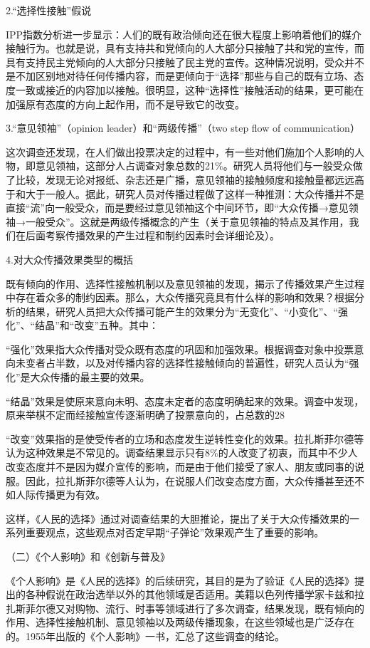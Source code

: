 \documentclass[UTF8,12pt]{ctexart}
\numberwithin{equation}{section} %
\numberwithin{figure}{section}
\numberwithin{table}{section}
\begin{document}
	2.“选择性接触”假说
	
	IPP指数分析进一步显示：人们的既有政治倾向还在很大程度上影响着他们的媒介接触行为。也就是说，具有支持共和党倾向的人大部分只接触了共和党的宣传，而具有支持民主党倾向的人大部分只接触了民主党的宣传。这种情况说明，受众并不是不加区别地对待任何传播内容，而是更倾向于“选择”那些与自己的既有立场、态度一致或接近的内容加以接触。很明显，这种“选择性”接触活动的结果，更可能在加强原有态度的方向上起作用，而不是导致它的改变。
	
	3.“意见领袖”（opinion leader）和“两级传播”（two step flow of communication）
	
	这次调查还发现，在人们做出投票决定的过程中，有一些对他们施加个人影响的人物，即意见领袖，这部分人占调查对象总数的21\%。研究人员将他们与一般受众做了比较，发现无论对报纸、杂志还是广播，意见领袖的接触频度和接触量都远远高于和大于一般人。据此，研究人员对传播过程做了这样一种推测：大众传播并不是直接“流”向一般受众，而是要经过意见领袖这个中间环节，即“大众传播→意见领袖→一般受众”。这就是两级传播概念的产生（关于意见领袖的特点及其作用，我们在后面考察传播效果的产生过程和制约因素时会详细论及）。
	
	4.对大众传播效果类型的概括
	
	既有倾向的作用、选择性接触机制以及意见领袖的发现，揭示了传播效果产生过程中存在着众多的制约因素。那么，大众传播究竟具有什么样的影响和效果？根据分析的结果，研究人员把大众传播可能产生的效果分为“无变化”、“小变化”、“强化”、“结晶”和“改变”五种。其中：
	
	“强化”效果指大众传播对受众既有态度的巩固和加强效果。根据调查对象中投票意向未变者占半数，以及对传播内容的选择性接触倾向的普遍性，研究人员认为“强化”是大众传播的最主要的效果。
	
	“结晶”效果是使原来意向未明、态度未定者的态度明确起来的效果。调查中发现，原来举棋不定而经接触宣传逐渐明确了投票意向的，占总数的28%
	
	“改变”效果指的是使受传者的立场和态度发生逆转性变化的效果。拉扎斯菲尔德等认为这种效果是不常见的。调查结果显示只有8\%的人改变了初衷，而其中不少人改变态度并不是因为媒介宣传的影响，而是由于他们接受了家人、朋友或同事的说服。因此，拉扎斯菲尔德等人认为，在说服人们改变态度方面，大众传播甚至还不如人际传播更为有效。
	
	这样，《人民的选择》通过对调查结果的大胆推论，提出了关于大众传播效果的一系列重要观点，这些观点对否定早期“子弹论”效果观产生了重要的影响。
	
	（二）《个人影响》和《创新与普及》
	
	《个人影响》是《人民的选择》的后续研究，其目的是为了验证《人民的选择》提出的各种假说在政治选举以外的其他领域是否适用。美籍以色列传播学家卡兹和拉扎斯菲尔德又对购物、流行、时事等领域进行了多次调查，结果发现，既有倾向的作用、选择性接触机制、意见领袖以及两级传播现象，在这些领域也是广泛存在的。1955年出版的《个人影响》一书，汇总了这些调查的结论。
	
\end{document}
